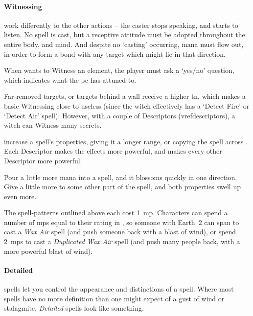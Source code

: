 \begin{multicols}{2}
\paragraph{Witnessing}
work differently to the other actions -- the caster stops speaking, and starts to listen.
No spell is cast, but a receptive attitude must be adopted throughout the entire body, and mind.
And despite no `casting' occurring, mana must flow out, in order to form a bond with any target which might lie in that direction.

When  wants to Witness an element, the player must ask a `yes/no' question, which indicates what the \gls{pc} has attuned to.

Far-removed targets, or targets behind a wall receive a higher \gls{tn}, which makes a basic Witnessing close to useless (since the witch effectively has a `Detect Fire' or `Detect Air' spell).
However, with a couple of Descriptors (vref{descriptors}), a witch can Witness many secrets.

\label{spellDescriptors}
increase a spell's properties, giving it a longer range, or copying the spell across .
Each Descriptor makes the effects more powerful, and makes every other Descriptor more powerful.

Pour a little more mana into a spell, and it blossoms quickly in one direction.
Give a little more to some other part of the spell, and both properties swell up even more.

The spell-patterns outlined above each cost 1~\gls{mp}.
Characters can spend a number of \glspl{mp} equal to their rating in , so someone with Earth~2 can span  to cast a \textit{Wax Air} spell (and push someone back with a blast of wind), or spend 2~\glspl{mp} to cast a \textit{Duplicated Wax Air} spell (and push many people back, with a more powerful blast of wind).

\paragraph{Detailed}
spells let you control the appearance and distinctions of a spell.
Where most spells have no more definition than one might expect of a gust of wind or stalagmite, \textit{Detailed} spells look like something.


\end{multicols}
